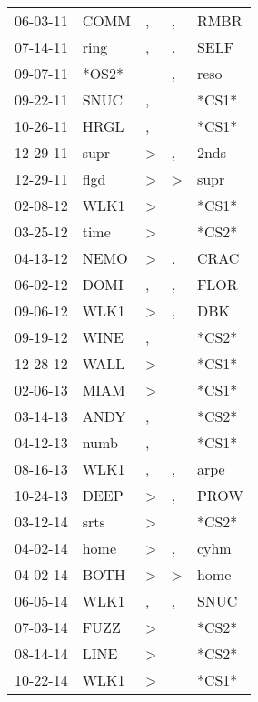 \begin{supertabular}{lllll}
 06-03-11 &   COMM &             , &             , &   RMBR \\
 07-14-11 &   ring &             , &             , &   SELF \\
 09-07-11 &  *OS2* &               &             , &   reso \\
 09-22-11 &   SNUC &             , &               &  *CS1* \\
 10-26-11 &   HRGL &             , &               &  *CS1* \\
 12-29-11 &   supr &  \textgreater &             , &   2nds \\
 12-29-11 &   flgd &  \textgreater &  \textgreater &   supr \\
 02-08-12 &   WLK1 &  \textgreater &               &  *CS1* \\
 03-25-12 &   time &  \textgreater &               &  *CS2* \\
 04-13-12 &   NEMO &  \textgreater &             , &   CRAC \\
 06-02-12 &   DOMI &             , &             , &   FLOR \\
 09-06-12 &   WLK1 &  \textgreater &             , &    DBK \\
 09-19-12 &   WINE &             , &               &  *CS2* \\
 12-28-12 &   WALL &  \textgreater &               &  *CS1* \\
 02-06-13 &   MIAM &  \textgreater &               &  *CS1* \\
 03-14-13 &   ANDY &             , &               &  *CS2* \\
 04-12-13 &   numb &             , &               &  *CS1* \\
 08-16-13 &   WLK1 &             , &             , &   arpe \\
 10-24-13 &   DEEP &  \textgreater &             , &   PROW \\
 03-12-14 &   srts &  \textgreater &               &  *CS2* \\
 04-02-14 &   home &  \textgreater &             , &   cyhm \\
 04-02-14 &   BOTH &  \textgreater &  \textgreater &   home \\
 06-05-14 &   WLK1 &             , &             , &   SNUC \\
 07-03-14 &   FUZZ &  \textgreater &               &  *CS2* \\
 08-14-14 &   LINE &  \textgreater &               &  *CS2* \\
 10-22-14 &   WLK1 &  \textgreater &               &  *CS1* \\

\end{supertabular}
